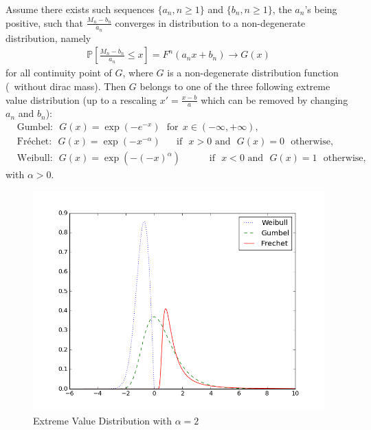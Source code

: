 \begin{theorem}
\label{thm:univariate-evt}
Assume there exists such sequences
$\{a_n, n \ge 1\}$ and $\{b_n, n \ge 1\}$, the $a_n$'s being positive, such that $\frac{M_n-b_n}{a_n} $ converges in distribution to a non-degenerate distribution, namely
\begin{align}
\label{eq:hyp-GEV}
\mathbb{P}\left[ \frac{M_n-b_n}{a_n} \le x \right] = F^n(a_n x + b_n) \to G(x)
\end{align}
for all continuity point of $G$, where $G$ is a non-degenerate distribution function (\ie~without dirac mass).
Then $G$ belongs to one of the three following extreme value distribution (up to a rescaling $x' = \frac{x-b}{a}$ which can be removed by changing $a_n$ and $b_n$):
\begin{align*}
&\text{Gumbel:}~~~  G(x) = \exp \left( -e^{-x} \right)~~~\text{for}~~ x \in (-\infty, +\infty),\\
&\text{Fréchet:}~~~ G(x) = \exp \left(-x^{-\alpha}\right) ~~~\text{~~~if~~} x > 0 \text{~and~~} G(x)=0 \text{~~otherwise},\\
&\text{Weibull:}~~~G(x) = \exp \left(-(-x)^{\alpha}\right) ~~~~~~~~~\text{~~~if~~} x < 0 \text{~and~~} G(x)=1 \text{~~otherwise},
\end{align*}
with $\alpha>0$.
\end{theorem}
\begin{figure}[!ht]
  \centering
  \includegraphics[width=.9\linewidth]{fig_source/GEV.png}
  \caption{Extreme Value Distribution with $\alpha = 2$}
  \label{fig:GEV}
\end{figure}

